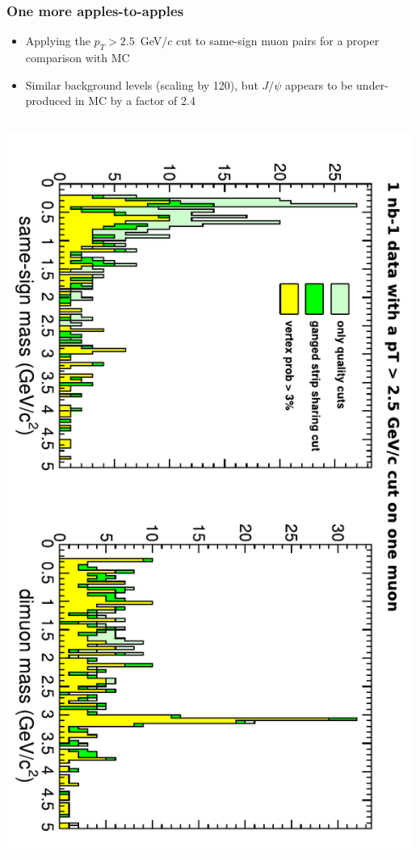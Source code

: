 \documentclass[compress]{beamer}
\begin{document}
\begin{frame}
\frametitle{One more apples-to-apples}

\begin{itemize}
\item Applying the $p_T > 2.5$~GeV/$c$ cut to same-sign muon pairs for a proper comparison with MC

\item Similar background levels (scaling by 120), but $J/\psi$ appears to be under-produced in MC by a factor of 2.4
\end{itemize}

\begin{columns}
\includegraphics[height=\linewidth, angle=90]{gangedstripcut_mass_cut25.pdf}


\end{columns}
\end{frame}
\end{document}
